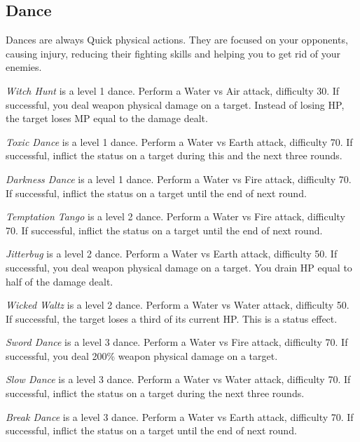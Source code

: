 \begin{multicols}{2}

    \subsection{Dance}\label{subsec:perf-dance}
    
    Dances are always Quick physical actions. They are focused on your opponents, causing injury, reducing their fighting skills and helping you to get rid of your enemies.
    
    \textit{Witch Hunt} is a level 1 dance. Perform a Water vs Air attack, difficulty 30. If successful, you deal weapon physical damage on a target. Instead of losing HP, the target loses MP equal to the damage dealt.
    
    \textit{Toxic Dance} is a level 1 dance. Perform a Water vs Earth attack, difficulty 70. If successful, inflict the  status on a target during this and the next three rounds.

    \textit{Darkness Dance} is a level 1 dance. Perform a Water vs Fire attack, difficulty 70. If successful, inflict the  status on a target until the end of next round.
    
    \textit{Temptation Tango} is a level 2 dance. Perform a Water vs Fire attack, difficulty 70. If successful, inflict the  status on a target until the end of next round.
    
    \textit{Jitterbug} is a level 2 dance. Perform a Water vs Earth attack, difficulty 50. If successful, you deal weapon physical damage on a target. You drain HP equal to half of the damage dealt.
    
    \textit{Wicked Waltz} is a level 2 dance. Perform a Water vs Water attack, difficulty 50. If successful, the target loses a third of its current HP\@. This is a  status effect.
    
    \textit{Sword Dance} is a level 3 dance. Perform a Water vs Fire attack, difficulty 70. If successful, you deal 200\% weapon physical damage on a target.
    
    \textit{Slow Dance} is a level 3 dance. Perform a Water vs Water attack, difficulty 70. If successful, inflict the  status on a target during the next three rounds.
    
    \textit{Break Dance} is a level 3 dance. Perform a Water vs Earth attack, difficulty 70. If successful, inflict the  status on a target until the end of next round.
    

\end{multicols}
